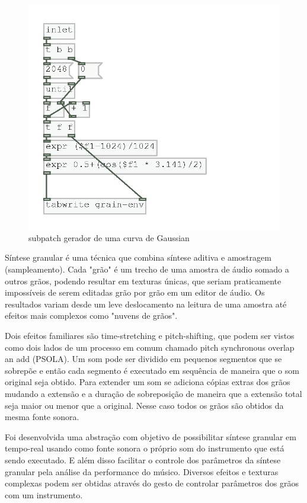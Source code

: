\documentclass{ppgmus}
\begin{document}
\begin{figure}
\includegraphics[scale=.6]{granular3}
\caption{subpatch gerador de uma curva de Gaussian}
\label{granular3}
\end{figure}

Síntese granular é uma técnica que combina síntese aditiva e amostragem (sampleamento).
Cada "grão" é um trecho de uma amostra de áudio somado a outros grãos, podendo
resultar em texturas únicas, que seriam praticamente impossíveis de serem editadas
grão por grão em um editor de áudio. Os resultados variam desde um leve deslocamento na leitura
de uma amostra até efeitos mais complexos como "nuvens de grãos".

Dois efeitos familiares são time-stretching e pitch-shifting, que podem ser vistos
como dois lados de um processo em comum chamado pitch synchronous overlap an add (PSOLA).
Um som pode ser dividido em pequenos segmentos que se sobrepõe e então cada segmento
é executado em sequência de maneira que o som original seja obtido. Para extender um
som se adiciona cópias extras dos grãos mudando a extensão e a duração de sobreposição
de maneira que a extensão total seja maior ou menor que a original. Nesse caso todos os 
grãos são obtidos da mesma fonte sonora.

Foi desenvolvida uma abstração com objetivo de possibilitar síntese granular em tempo-real usando como
fonte sonora o próprio som do instrumento que está sendo executado. E além
disso facilitar o controle dos parâmetros da síntese granular pela análise
da performance do músico. Diversos efeitos e texturas complexas podem ser obtidas
através do gesto de controlar parâmetros dos grãos com um instrumento.
\end{document}
